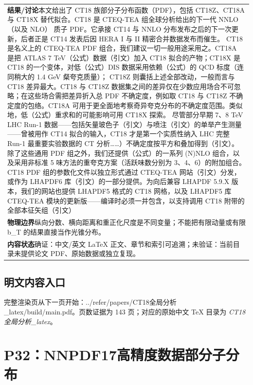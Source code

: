 \documentclass[UTF8,11pt,oneside]{ctexbook}
\begin{document}
\begin{table}[htbp]
\begin{tabular}{@{}p{}@{}}
    \textbf{结果/讨论}\quad 本文给出了 CT18 族部分子分布函数（PDF），包括 CT18Z、CT18A 与 CT18X 替代拟合。CT18 是 CTEQ-TEA 组全球分析给出的下一代 NNLO（以及 NLO） 质子 PDF。它承接 CT14 与 NNLO 分布发布之后的下一次更新，后者正是 CT14 发表后因 HERA I 与 II 精密合并数据发布而催生。 CT18 是名义上的 CTEQ-TEA PDF 组合，我们建议一切一般用途采用之。CT18A 是把 ATLAS 7 TeV（公式）数据（引文）加入 CT18 拟合的产物；CT18X 是 CT18 的一个变体，对低（公式）DIS 数据采用依赖（公式）的 QCD 标度（连同稍大的 1.4 GeV 粲夸克质量）； CT18Z 则囊括上述全部改动，一般而言与 CT18 差异最大。CT18 与 CT18Z 数据集之间的差异仅在少数应用场合不可忽略；在这些场合需把差异折入总 PDF 不确定度，例如取 CT18 与 CT18Z 不确定度的包络。CT18A 可用于更全面地考察奇异夸克分布的不确定度范围。类似地，低（公式）重求和的可能影响可用 CT18X 探索。 尽管部分早期 7、8 TeV LHC Run-1 数据——包括矢量玻色子（引文）与喷注（引文）的单举产生测量——曾被用作 CT14 拟合的输入，CT18 才是第一个实质性纳入 LHC 完整 Run-1 最重要实验数据的 CT 分析……）不确定度按平方和叠加得到（引文）。 除了这些通用 PDF 组之外，我们还提供（公式）的一系列 (N)NLO 组合，以及采用非标准 5 味方法的重夸克方案（活跃味数分别为 3、4、6）的附加组合。 CT18 PDF 组的参数化文件以独立形式通过 CTEQ-TEA 网站（引文）分发，或作为 LHAPDF6 库（引文）的一部分提供。为向后兼容 LHAPDF 5.9.X 版本，我们的网站也提供 LHAPDF5 格式的 CT18 网格，以及 LHAPDF5 库 CTEQ-TEA 模块的更新版——编译时必须一并包含，以支持调用 CT18 附带的全部本征矢组（引文） \\
    \textbf{物理边界}\quad 纵向分数、横向距离和重正化尺度是不同变量；不能把有限动量或有限 b\_T 的结果直接当作光锥分布。 \\
    \textbf{内容状态}\quad 确证：中文/英文 LaTeX 正文、章节和索引可追溯；未验证：当前目录未提供论文 PDF、原始数据或独立复现。 \\
    \bottomrule
  \end{tabular}
\end{table}
\section*{明文内容入口}
\noindent 完整渲染页从下一页开始：../\allowbreak{}refer/\allowbreak{}papers/\allowbreak{}CT18全局分析\_\allowbreak{}latex/\allowbreak{}build/\allowbreak{}main.pdf。页数证据为 143 页；对应的原始中文 TeX 目录为 \emph{CT18全局分析\_latex}。
\clearpage

\clearpage

\chapter{P32：NNPDF17高精度数据部分子分布}
\end{document}
